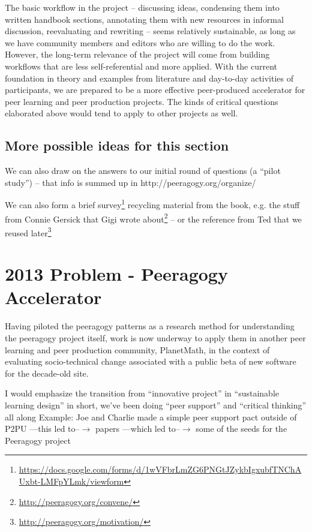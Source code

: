 \documentclass{acm_proc_article-sp}
\begin{document}
The basic workflow in the project -- discussing ideas, condensing them into written handbook sections, annotating them with new resources in informal discussion, reevaluating and rewriting -- seems relatively sustainable, as long as we have community members and editors who are willing to do the work. However, the long-term relevance of the project will come from building workflows that are less self-referential and more applied. With the current foundation in theory and examples from literature and day-to-day activities of participants, we are prepared to be a more effective peer-produced accelerator for peer learning and peer production projects. The kinds of critical questions elaborated above would tend to apply to other projects as well.

\subsection{More possible ideas for this section}

We can also draw on the answers to our initial round of questions (a ``pilot study'') -- that info is summed up in http://peeragogy.org/organize/

We can also form a brief survey\footnote{\url{https://docs.google.com/forms/d/1wVFbrLmZG6PNGtJZykbIgxubfTNChAUxbt-LMFpYLmk/viewform}} recycling material from the book, e.g. the stuff from Connie Gersick that Gigi wrote about\footnote{\url{http://peeragogy.org/convene/}} -- or the reference from Ted that we reused later\footnote{\url{http://peeragogy.org/motivation/}}

%
%
%
%

\section{2013 Problem - Peeragogy Accelerator}

Having piloted the peeragogy patterns as a research method for understanding the peeragogy project itself, work is now underway to apply them in another peer learning and peer production community, PlanetMath, in the context of evaluating socio-technical change associated with a public beta of new software for the decade-old site.

I would emphasize the transition from ``innovative project'' in ``sustainable learning design'' in short, we've been doing ``peer support'' and ``critical thinking'' all along
Example: Joe and Charlie made a simple peer support pact outside of P2PU ---this led to--$\rightarrow$ papers ---which led to--$\rightarrow$ some of the seeds for the Peeragogy project
\end{document}
